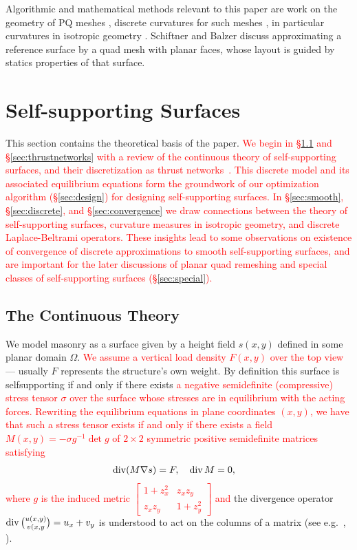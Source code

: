 \documentclass[annual]{acmsiggraph}
\def\Div{\mathop{{\rm div}}\nolimits}
\newcommand{\newtext}[1]{\textcolor{red}{#1}}
\begin{document}
Algorithmic and mathematical methods relevant to this paper are work on
the geometry of PQ meshes \cite{Liu2006},
discrete curvatures for such meshes \cite{Pottmann2007b,bobenko-2010-ct},
in particular curvatures in isotropic geometry \cite{Pottmann2007}.
Schiftner and Balzer  discuss approximating a
reference surface by a quad mesh with planar faces, whose layout is guided
by statics properties of that surface.

\section{Self-supporting Surfaces}

This section contains the theoretical basis of the paper. \newtext{We begin in \S\ref{ssec:cont}
and \S\ref{sec:thrustnetworks} with a review of the continuous theory of self-supporting surfaces, and their discretization as thrust networks~\cite{Block07}. This discrete model and its associated equilibrium equations form the groundwork of our optimization algorithm (\S\ref{sec:design}) for designing self-supporting surfaces. In \S\ref{sec:smooth}, \S\ref{sec:discrete}, and \S\ref{sec:convergence} we draw connections
between the theory of self-supporting surfaces, curvature measures in isotropic geometry, and discrete Laplace-Beltrami operators. These insights lead to some observations on existence of convergence of discrete approximations to smooth self-supporting surfaces, and are important for the later discussions of planar quad remeshing and special classes of self-supporting surfaces (\S\ref{sec:special}).}

\subsection{The Continuous Theory}
\label{ssec:cont}

We model masonry as a surface given by a height field $s(x,y)$
defined in some planar domain $\Omega$. \newtext{We assume a vertical
load density $F(x,y)$ over the top view} --- usually $F$ represents the structure's own weight. By
definition this surface is self\dash supporting if and only if there
exists \newtext{a negative semidefinite (compressive) stress tensor $\sigma$ over the surface whose stresses are in equilibrium with the
acting forces. Rewriting the equilibrium equations in plane coordinates $(x,y)$, we have that such a stress tensor exists if and only if there exists a field $M(x,y) = -\sigma g^{-1} \det g$ of
$2\times 2$ symmetric positive semidefinite matrices satisfying}
	\begin{align}
	\Div (M\nabla s) = F, \quad
	\Div M &= 0,
	  \label{eq:conds}
	\end{align}
 \newtext{where $g$ is the induced metric $\left[\begin{smallmatrix}1+z_x^2 & z_xz_y \\ z_xz_y & 1+z_y^2\end{smallmatrix}\right]$ and} the divergence operator $\Div{u(x,y)\choose v(x,y}= u_x + v_y$ is
understood to act on the columns of a matrix (see e.g.\
\cite{Fraternali2010}, \cite{Giaquinta1985}).
\end{document}
